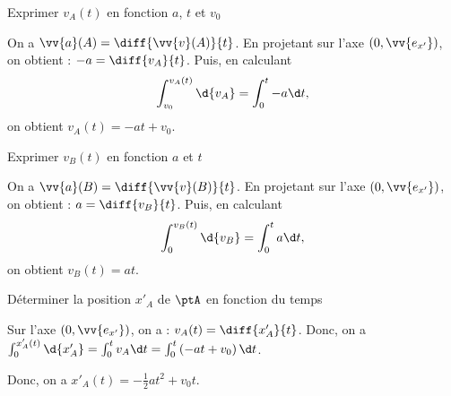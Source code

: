 \debutEntrainement



\begin{enonce}
Exprimer $v_A(t)$  en fonction $a$, $t$ et $v_0$ 
\end{enonce}


\begin{corrige}
	On a $\vv{a}(A) = 
	\diff{\vv{v}(A)}{t}$.  
	En projetant sur l'axe $(0,\vv{e_{x'}})$, on obtient : $-a = 
	\diff{v_A}{t} $. Puis, en calculant
	\[
	\int^{v_A(t)}_{v_0}	\d {v_A}=\int^t_0 -a  \d t,
	\]
	on obtient $v_A(t)=-at+v_0$.
\end{corrige}




\begin{enonce}
	Exprimer $v_B(t)$  en fonction $a$ et $t$
\end{enonce}


\begin{corrige}
	On a $\vv{a}(B) = 
	\diff{\vv{v}(B)}{t}$. 
	En projetant sur l'axe $(0,\vv{e_{x'}})$, on obtient : $a = 
	\diff{v_B}{t}$. Puis, en calculant
	\[
	\int^{v_B(t)}_{0} \d {v_B}=\int^t_0 a  \d t,
	\]
	on obtient  $v_B(t)=at$.
\end{corrige}




\begin{enonce}
	Déterminer la position $x'_A$ de $\ptA$ en fonction du temps
\end{enonce}


\begin{corrige}
	Sur l'axe $(0,\vv{e_{x'}})$,  on a : $v_A(t) = 
	\diff{x'_A}{t} $. 
	Donc, on a
	$\int^{x'_A(t)}_{0}	\d {x'_A}=\int^t_0 v_A  \d t=\int^t_0 \left(-at+v_0\right)  \d t$. 
	
	Donc, 
	on a  $x'_A(t)=-\frac{1}{2}at^2+v_0t$.
\end{corrige}

